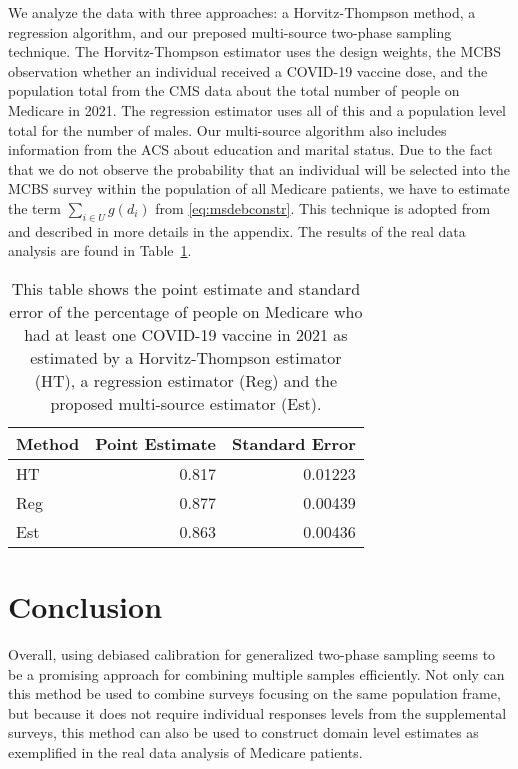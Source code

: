 \documentclass[12pt]{article}
\begin{document}
We analyze the data with three approaches: a Horvitz-Thompson method, a
regression algorithm, and our preposed multi-source two-phase sampling technique. 
The Horvitz-Thompson estimator uses the design weights, the MCBS observation
whether an individual received a COVID-19 vaccine dose, and the population total
from the CMS data about the total number of people on Medicare in 2021. The
regression estimator uses all of this and a population level total for the
number of males. Our multi-source algorithm also includes information from the
ACS about education and marital status. Due to the fact that we do not observe
the probability that an individual will be selected into the MCBS survey within
the population of all Medicare patients, we have to estimate the term $\sum_{i
\in U} g(d_i)$ from \eqref{eq:msdebconstr}. This technique is adopted
from \cite{kwon2024debiased} and described in more details in the appendix.
The results of the real data analysis are found in Table~\ref{tab:mcbsres}.

\begin{table}[ht!]
  \centering
  \label{tab:mcbsres}
  \begin{tabular}{lrr}
    \toprule
    Method & Point Estimate & Standard Error \\
    \midrule
    HT  & 0.817 & 0.01223 \\
    Reg & 0.877 & 0.00439 \\
    Est & 0.863 & 0.00436 \\ 
    \bottomrule
  \end{tabular}
  \caption{This table shows the point estimate and standard error of the
  percentage of people on Medicare who had at least one COVID-19 vaccine in
  2021 as estimated by a Horvitz-Thompson estimator (HT), a regression estimator
  (Reg) and the proposed multi-source estimator (Est).}
\end{table}

\section{Conclusion}

Overall, using debiased calibration for generalized two-phase sampling seems to
be a promising approach for combining multiple samples efficiently. Not only can
this method be used to combine surveys focusing on the same population frame,
but because it does not require individual responses levels from the
supplemental surveys, this method can also be used to construct domain level
estimates as exemplified in the real data analysis of Medicare patients.
\end{document}
